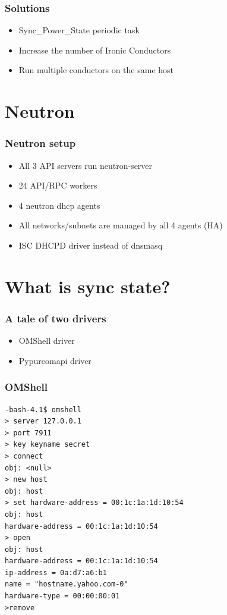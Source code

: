 \documentclass[aspectratio=169,11pt,hyperref={colorlinks=true}]{beamer}
\newcommand\Fontvi{\fontsize{6}{7.2}\selectfont}
\begin{document}
\begin{frame}
    \frametitle{Solutions}
    \begin{itemize}[<+-| alert@+>]
        \item Sync\_Power\_State periodic task
        \item Increase the number of Ironic Conductors
        \item Run multiple conductors on the same host
    \end{itemize}
\end{frame}


\section{Neutron}
\begin{frame}
    \frametitle{Neutron setup}
    \begin{itemize}[<+-| alert@+>]
        \item All 3 API servers run neutron-server
        \item 24 API/RPC workers
        \item 4 neutron dhcp agents
        \item All networks/subnets are managed by all 4 agents (HA)
        \item ISC DHCPD driver instead of dnsmasq
    \end{itemize}
\end{frame}

\section{What is sync state?}
\begin{frame}
    \frametitle{A tale of two drivers}
    \begin{itemize}[<+-| alert@+>]
        \item OMShell driver
        \item Pypureomapi driver
    \end{itemize}
\end{frame}

\begin{frame}[fragile]
    \frametitle{OMShell}
    \Fontvi
\begin{verbatim}
-bash-4.1$ omshell
> server 127.0.0.1
> port 7911
> key keyname secret
> connect
obj: <null>
> new host
obj: host
> set hardware-address = 00:1c:1a:1d:10:54  
obj: host
hardware-address = 00:1c:1a:1d:10:54
> open
obj: host
hardware-address = 00:1c:1a:1d:10:54
ip-address = 0a:d7:a6:b1
name = "hostname.yahoo.com-0"
hardware-type = 00:00:00:01
>remove
    \end{verbatim}
\end{frame}
\end{document}
